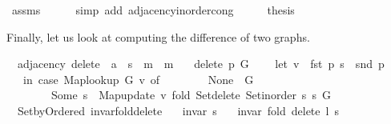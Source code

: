 \begin{isabellebody}
\ assms{\isacharparenleft}{\kern0pt}{}{\isacharparenright}{\kern0pt}\isanewline
\ \ \ \ \isamarkupfalse%
\ {\isacharparenleft}{\kern0pt}simp\ add{\isacharcolon}{\kern0pt}\ adjacency{\isacharunderscore}{\kern0pt}inorder{\isacharunderscore}{\kern0pt}cong{\isacharparenright}{\kern0pt}\isanewline
\ \ \isamarkupfalse%
\ \isamarkupfalse%
\ {\isacharquery}{\kern0pt}thesis\isanewline
\ \ \ \ \isacommand{{\isachardot}{\kern0pt}}\isamarkupfalse%
\isanewline
{}\isamarkupfalse%
%
\endisatagproof
{\isafoldproof}%
%
\isadelimproof
%
\endisadelimproof
%
\begin{isamarkuptext}%
Finally, let us look at computing the difference of two graphs.%
\end{isamarkuptext}\isamarkuptrue%
\isamarkupfalse%
\ {\isacharparenleft}{\kern0pt}\ adjacency{\isacharparenright}{\kern0pt}\ delete{\isacharunderscore}{\kern0pt}{}\ {\isacharcolon}{\kern0pt}{\isacharcolon}{\kern0pt}\ {\isachardoublequoteopen}{\isacharprime}{\kern0pt}a\ {\isasymtimes}\ {\isacharprime}{\kern0pt}s\ {\isasymRightarrow}\ {\isacharprime}{\kern0pt}m\ {\isasymRightarrow}\ {\isacharprime}{\kern0pt}m{\isachardoublequoteclose}\ \isanewline
\ \ {\isachardoublequoteopen}delete{\isacharunderscore}{\kern0pt}{}\ p\ G\ {\isasymequiv}\isanewline
\ \ \ let\ v\ {\isacharequal}{\kern0pt}\ fst\ p{\isacharsemicolon}{\kern0pt}\ s\ {\isacharequal}{\kern0pt}\ snd\ p\isanewline
\ \ \ in\ case\ Map{\isacharunderscore}{\kern0pt}lookup\ G\ v\ of\isanewline
\ \ \ \ \ \ \ \ None\ {\isasymRightarrow}\ G\ {\isacharbar}{\kern0pt}\isanewline
\ \ \ \ \ \ \ \ Some\ s{\isacharprime}{\kern0pt}\ {\isasymRightarrow}\ Map{\isacharunderscore}{\kern0pt}update\ v\ {\isacharparenleft}{\kern0pt}fold\ Set{\isacharunderscore}{\kern0pt}delete\ {\isacharparenleft}{\kern0pt}Set{\isacharunderscore}{\kern0pt}inorder\ s{\isacharparenright}{\kern0pt}\ s{\isacharprime}{\kern0pt}{\isacharparenright}{\kern0pt}\ G{\isachardoublequoteclose}\isanewline
%
\isadeliminvisible
\isanewline
%
\endisadeliminvisible
%
\isataginvisible
{}\isamarkupfalse%
\ {\isacharparenleft}{\kern0pt}\ Set{\isacharunderscore}{\kern0pt}by{\isacharunderscore}{\kern0pt}Ordered{\isacharparenright}{\kern0pt}\ invar{\isacharunderscore}{\kern0pt}fold{\isacharunderscore}{\kern0pt}delete{\isacharcolon}{\kern0pt}\isanewline
\ \ \ {\isachardoublequoteopen}invar\ s{\isachardoublequoteclose}\isanewline
\ \ \ {\isachardoublequoteopen}invar\ {\isacharparenleft}{\kern0pt}fold\ delete\ l\ s{\isacharparenright}{\kern0pt}{\isachardoublequoteclose}%

\end{isabellebody}
